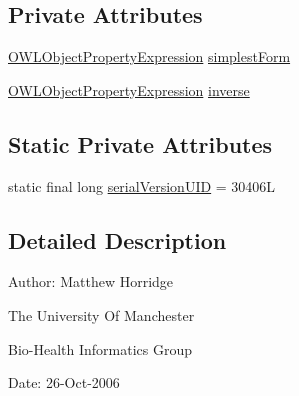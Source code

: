 \subsection*{Private Attributes}
\begin{DoxyCompactItemize}
\item 
\hyperlink{interfaceorg_1_1semanticweb_1_1owlapi_1_1model_1_1_o_w_l_object_property_expression}{O\-W\-L\-Object\-Property\-Expression} \hyperlink{classuk_1_1ac_1_1manchester_1_1cs_1_1owl_1_1owlapi_1_1_o_w_l_object_property_expression_impl_a7d3eccb216021b4172f211a713573e14}{simplest\-Form}
\item 
\hyperlink{interfaceorg_1_1semanticweb_1_1owlapi_1_1model_1_1_o_w_l_object_property_expression}{O\-W\-L\-Object\-Property\-Expression} \hyperlink{classuk_1_1ac_1_1manchester_1_1cs_1_1owl_1_1owlapi_1_1_o_w_l_object_property_expression_impl_ac3de8317b17ba7479c785fd4c7ee955f}{inverse}
\end{DoxyCompactItemize}
\subsection*{Static Private Attributes}
\begin{DoxyCompactItemize}
\item 
static final long \hyperlink{classuk_1_1ac_1_1manchester_1_1cs_1_1owl_1_1owlapi_1_1_o_w_l_object_property_expression_impl_aa0bfbf1259fffc979dd654ae625ff6e7}{serial\-Version\-U\-I\-D} = 30406\-L
\end{DoxyCompactItemize}


\subsection{Detailed Description}
Author\-: Matthew Horridge\par
 The University Of Manchester\par
 Bio-\/\-Health Informatics Group\par
 Date\-: 26-\/\-Oct-\/2006\par
\par
 

